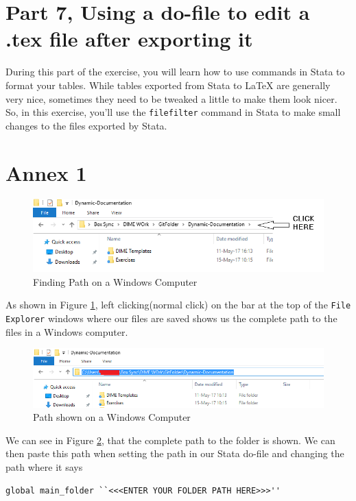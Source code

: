 \documentclass[]{article}
\begin{document}
\section*{Part 7, Using a do-file to edit a .tex file after exporting it}
During this part of the exercise, you will learn how to use commands in Stata to format your tables. While tables exported from Stata to {\LaTeX} are generally very nice, sometimes they need to be tweaked a little to make them look nicer. So, in this exercise, you'll use the \texttt{filefilter} command in Stata to make small changes to the files exported by Stata. 

\newpage
\section*{Annex 1} {\label{annex1}}

\begin{figure}[H]
	\centering
	\includegraphics[width=1\linewidth]{img/pathwin}
	\caption{Finding Path on a Windows Computer}
	\label{fig:pathwin}
\end{figure}
As shown in Figure \ref{fig:pathwin}, left clicking(normal click) on the bar at the top of the \texttt{File Explorer} windows where our files are saved shows us the complete path to the files in a Windows computer. \\

\begin{figure}[H]
	\centering
	\includegraphics[width=1\linewidth]{img/pathwin2}
	\caption{Path shown on a Windows Computer}
	\label{fig:pathwin2}
\end{figure}

We can see in Figure \ref{fig:pathwin2}, that the complete path to the folder is shown. We can then paste this path when setting the path in our Stata do-file and changing the path where it says \begin{verbatim}
global main_folder ``<<<ENTER YOUR FOLDER PATH HERE>>>''
\end{verbatim} 
	
\end{document}
